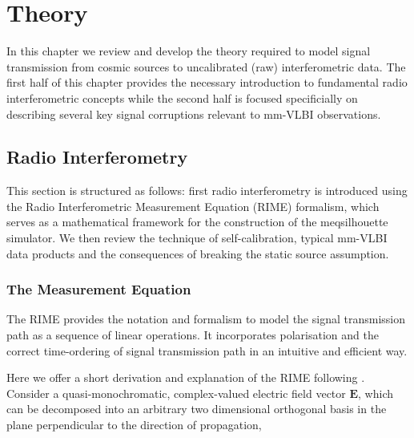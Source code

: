 \chapter{Theory}\label{chap:theory}
In this chapter we review and develop the theory required to model signal transmission from cosmic sources to uncalibrated (raw) interferometric data. The first half of this chapter provides the necessary introduction to fundamental radio interferometric concepts while the second half is focused specificially on describing several key signal corruptions relevant to mm-VLBI observations. 

\section{Radio Interferometry}\label{sec:radio_int}

This section is structured as follows: first radio interferometry is introduced using the Radio Interferometric Measurement Equation (RIME) formalism, which serves as a mathematical framework for the construction of the {\sc meqsilhouette} simulator. We then review the technique of self-calibration, typical mm-VLBI data products and the consequences of breaking the static source assumption.

\subsection{The Measurement Equation}\label{sec:RIME}

The RIME provides the notation and formalism to model the signal transmission path as a sequence of linear operations. It incorporates polarisation and the correct time-ordering of signal transmission path in an intuitive and efficient way.


Here we offer a short derivation and explanation of the RIME following \citet{Smirnov_2011a}. Consider a quasi-monochromatic, complex-valued electric field vector $\bm{E}$, which can be decomposed into an arbitrary two dimensional orthogonal basis in the plane perpendicular to the direction of propagation,

